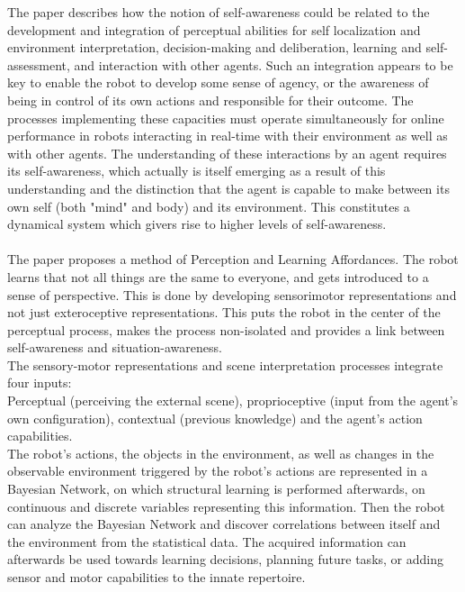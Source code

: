 \documentclass{amsbook}
\begin{document}
{{\begin{enumerate}
\end{enumerate} 
}
The paper describes how the notion of self-awareness could be related to the development and integration of perceptual abilities for self localization and environment interpretation, decision-making and deliberation, learning and self-assessment, and interaction with other agents. Such an integration appears to be key to enable the robot to develop some sense of agency, or the awareness of being in control of its own actions and responsible for their outcome. The processes implementing these capacities must operate simultaneously for online performance in robots interacting in real-time with their environment as well as with other agents. The understanding of these interactions by an agent requires its self-awareness, which actually is itself emerging as a result of this understanding and the distinction that the agent is capable to make between its own self (both "mind" and body) and its environment. This constitutes a dynamical system which givers rise to higher levels of self-awareness.\\\\
The paper proposes a method of Perception and Learning Affordances. The robot learns that not all things are the same to everyone, and gets introduced to a sense of perspective. This is done by developing sensorimotor representations and not just exteroceptive representations. This puts the robot in the center of the perceptual process, makes the process non-isolated and provides a link between self-awareness and situation-awareness.\\
The sensory-motor representations and scene interpretation processes integrate four inputs:\\Perceptual (perceiving the external scene), proprioceptive (input from the agent’s own conﬁguration), contextual (previous knowledge) and the agent’s action capabilities. 
\\The robot’s actions, the objects in the environment, as well as changes in the observable environment triggered by the robot’s actions are represented in a Bayesian Network, on which structural learning is performed afterwards, on continuous and discrete variables representing this information. Then the robot can analyze the Bayesian Network and discover correlations between itself and the environment from the statistical data.
The acquired information can afterwards be used towards learning decisions, planning future tasks, or adding sensor and motor capabilities to the innate repertoire.\\\\
}
\end{document}
